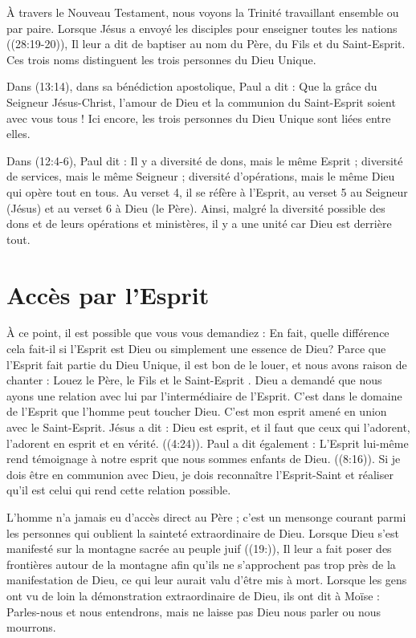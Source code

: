 À travers le Nouveau Testament, nous voyons la Trinité travaillant ensemble ou par paire. Lorsque Jésus a envoyé les disciples pour enseigner toutes les nations ((28:19-20)), Il leur a dit de baptiser au nom du Père, du Fils et du Saint-Esprit. Ces trois noms distinguent les trois personnes du Dieu Unique.

Dans (13:14), dans sa bénédiction apostolique, Paul a dit : \og Que la grâce du Seigneur Jésus-Christ, l'amour de Dieu et la communion du Saint-Esprit soient avec vous tous ! \fg{} Ici encore, les trois personnes du Dieu Unique sont liées entre elles.

Dans (12:4-6), Paul dit : \og Il y a diversité de dons, mais le même Esprit ; diversité de services, mais le même Seigneur ; diversité d'opérations, mais le même Dieu qui opère tout en tous. \fg{} Au verset 4, il se réfère à l'Esprit, au verset 5 au Seigneur (Jésus) et au verset 6 à Dieu (le Père). Ainsi, malgré la diversité possible des dons et de leurs opérations et ministères, il y a une unité car Dieu est derrière tout.


\section{Accès par l'Esprit}

À ce point, il est possible que vous vous demandiez : \og En fait, quelle différence cela fait-il si l'Esprit est Dieu ou simplement une essence de Dieu? \fg{} Parce que l'Esprit fait partie du Dieu Unique, il est bon de le louer, et nous avons raison de chanter : \og Louez le Père, le Fils et le Saint-Esprit \fg{}. Dieu a demandé que nous ayons une relation avec lui par l'intermédiaire de l'Esprit. C'est dans le domaine de l'Esprit que l'homme peut toucher Dieu. C'est mon esprit amené en union avec le Saint-Esprit. Jésus a dit : \og Dieu est esprit, et il faut que ceux qui l'adorent, l'adorent en esprit et en vérité. \fg{} ((4:24)). Paul a dit également : \og L'Esprit lui-même rend témoignage à notre esprit que nous sommes enfants de Dieu.  \fg{} ((8:16)). Si je dois être en communion avec Dieu, je dois reconnaître l'Esprit-Saint et réaliser qu'il est celui qui rend cette relation possible.

L'homme n'a jamais eu d'accès direct au Père ; c'est un mensonge courant parmi les personnes qui oublient la sainteté extraordinaire de Dieu. Lorsque Dieu s'est manifesté sur la montagne sacrée au peuple juif ((19:)), Il leur a fait poser des frontières autour de la montagne afin qu'ils ne s'approchent pas trop près de la manifestation de Dieu, ce qui leur aurait valu d'être mis à mort. Lorsque les gens ont vu de loin la démonstration extraordinaire de Dieu, ils ont dit à Moïse : \og Parles-nous et nous entendrons, mais ne laisse pas Dieu nous parler ou nous mourrons. \fg{}

